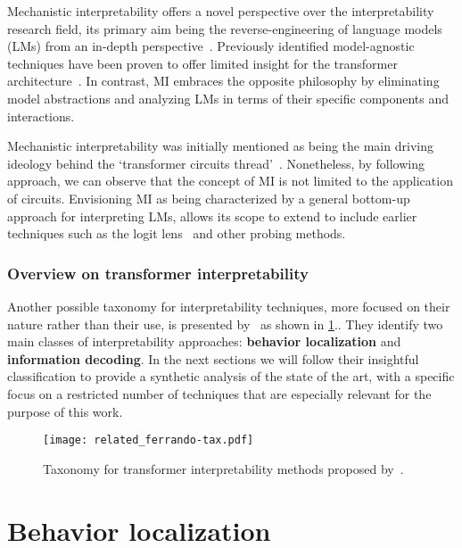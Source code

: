Mechanistic interpretability offers a novel perspective over the interpretability research field, its primary aim being the reverse-engineering of language models (LMs) from an in-depth perspective~\cite{olah2022}.
Previously identified model-agnostic techniques have been proven to offer limited insight for the transformer architecture~\cite{neely2022,pruthi2022,bibal2022,krishna2024}.
In contrast, MI embraces the opposite philosophy by eliminating model abstractions and analyzing LMs in terms of their specific components and interactions.

Mechanistic interpretability was initially mentioned as being the main driving ideology behind the `transformer circuits thread'~\cite{elhage2021}.
Nonetheless, by following~\citet{rai2024} approach, we can observe that the concept of MI is not limited to the application of circuits.
Envisioning MI as being characterized by a general bottom-up approach for interpreting LMs, allows its scope to extend to include earlier techniques such as the logit lens~\cite{nostalgebraist2020} and other probing methods.

\subsubsection*{Overview on transformer interpretability}

Another possible taxonomy for interpretability techniques, more focused on their nature rather than their use, is presented by~\citet{ferrando2024} as shown in \cref{fig:related_ferrando-tax}..
They identify two main classes of interpretability approaches: \textbf{behavior localization} and \textbf{information decoding}.
In the next sections we will follow their insightful classification to provide a synthetic analysis of the state of the art, with a specific focus on a restricted number of techniques that are especially relevant for the purpose of this work.

\begin{figure}[t!]
    \centering
    \texttt{[image: related\_ferrando-tax.pdf]}
    \caption{Taxonomy for transformer interpretability methods proposed by~\citet{ferrando2024}.}
    \label{fig:related_ferrando-tax}
\end{figure}

\section{Behavior localization}

